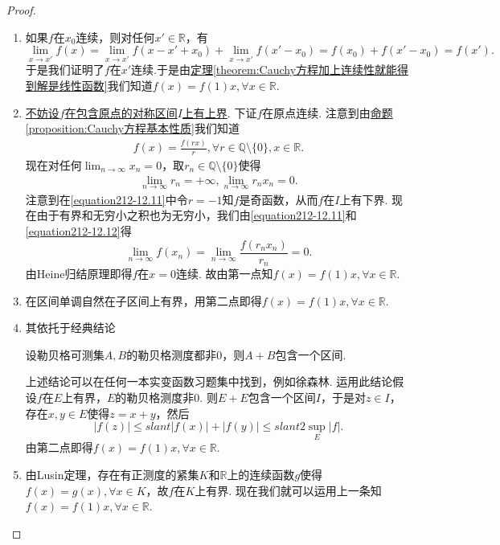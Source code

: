 \documentclass[../../main.tex]{subfiles}
\begin{document}
\begin{proof}
\begin{enumerate}
\item 如果\(f\)在\(x_0\)连续，则对任何\(x'\in\mathbb{R}\)，有
\[
\lim_{x\rightarrow x'} f(x)=\lim_{x\rightarrow x'} f(x - x'+x_0)+\lim_{x\rightarrow x'} f(x' - x_0)=f(x_0)+f(x' - x_0)=f(x').
\]
于是我们证明了\(f\)在\(x'\)连续.于是由\hyperref[theorem:Cauchy方程加上连续性就能得到解是线性函数]{定理\ref{theorem:Cauchy方程加上连续性就能得到解是线性函数}}我们知道\(f(x)=f(1)x,\forall x\in\mathbb{R}\).

\item \hyperlink{不妨设的原因112}{不妨设\(f\)在包含原点的对称区间\(I\)上有上界}. 下证\(f\)在原点连续. 注意到由\hyperref[proposition:Cauchy方程基本性质]{命题\ref{proposition:Cauchy方程基本性质}}我们知道
\begin{align}
f(x)=\frac{f(rx)}{r},\forall r\in\mathbb{Q}\setminus\{0\},x\in\mathbb{R}.\label{equation212-12.11}
\end{align}
现在对任何\(\lim_{n\rightarrow\infty}x_n = 0\)，取\(r_n\in\mathbb{Q}\setminus\{0\}\)使得
\begin{align}
\lim_{n\rightarrow\infty}r_n=+\infty,\lim_{n\rightarrow\infty}r_nx_n = 0.\label{equation212-12.12} 
\end{align}
注意到在\eqref{equation212-12.11}中令\(r = -1\)知\(f\)是奇函数，从而\(f\)在\(I\)上有下界. 现在由于有界和无穷小之积也为无穷小，我们由\eqref{equation212-12.11}和\eqref{equation212-12.12}得
\[
\lim_{n\rightarrow\infty} f(x_n)=\lim_{n\rightarrow\infty}\frac{f(r_nx_n)}{r_n}=0.
\]
由Heine归结原理即得\(f\)在\(x = 0\)连续. 故由第一点知\(f(x)=f(1)x,\forall x\in\mathbb{R}\).

\item 在区间单调自然在子区间上有界，用第二点即得\(f(x)=f(1)x,\forall x\in\mathbb{R}\).

\item 其依托于经典结论
\begin{conclusion}
设勒贝格可测集\(A,B\)的勒贝格测度都非\(0\)，则\(A + B\)包含一个区间.
\end{conclusion}
上述结论可以在任何一本实变函数习题集中找到，例如徐森林. 运用此结论假设\(f\)在\(E\)上有界，\(E\)的勒贝格测度非\(0\). 则\(E + E\)包含一个区间\(I\)，于是对\(z\in I\)，存在\(x,y\in E\)使得\(z = x + y\)，然后
\[
|f(z)|\leqslant slant|f(x)|+|f(y)|\leqslant slant 2\sup_E|f|.
\]
由第二点即得\(f(x)=f(1)x,\forall x\in\mathbb{R}\).

\item 由Lusin定理，存在有正测度的紧集\(K\)和\(\mathbb{R}\)上的连续函数\(g\)使得\(f(x)=g(x),\forall x\in K\)，故\(f\)在\(K\)上有界.
现在我们就可以运用上一条知\(f(x)=f(1)x,\forall x\in\mathbb{R}\).


\end{enumerate}
\end{proof}
\end{document}
